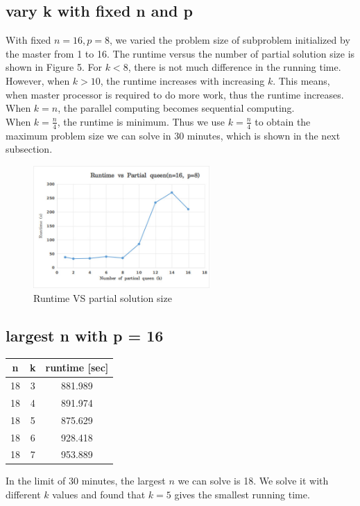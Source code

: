 \documentclass[twoside,12pt]{article}
\begin{document}
\subsection{vary k with fixed n and p}
    With fixed $ n = 16, p = 8 $, we varied the problem size of subproblem initialized by the master from 1 to 16. The runtime versus the number of partial solution size is shown in Figure 5. For $ k < 8 $, there is not much difference in the running time. However, when $ k > 10 $, the runtime increases with increasing $ k $. This means, when master processor is required to do more work, thus the runtime increases. When $ k = n $, the parallel computing becomes sequential computing.\\
    When $ k = \frac{n}{4} $, the runtime is minimum. Thus we use $ k = \frac{n}{4} $ to obtain the maximum problem size we can solve in 30 minutes, which is shown in the next subsection.
	\begin{figure}[H]
	\begin{centering}
	\includegraphics[width=0.6\textwidth]{runVSk}
	\caption{Runtime VS partial solution size}
	\end{centering}
    \end{figure}


\subsection{largest n with  p = 16 }
\begin{center}
	\begin{tabular}{ |c| c |c|}
		\hline
		n & k & runtime [sec] \\
		\hline
		18 & 3 & 881.989 \\
		\hline
		18 & 4 & 891.974 \\
		\hline
		18 & 5 & 875.629 \\
		\hline
		18 & 6 & 928.418 \\
		\hline
		18 & 7 & 953.889 \\
		\hline
		
	\end{tabular}	
\end{center}
In the limit of 30 minutes, the largest $ n $ we can solve is 18. We solve it with different $ k $ values and found that $ k = 5 $ gives the smallest running time.
\end{document}
